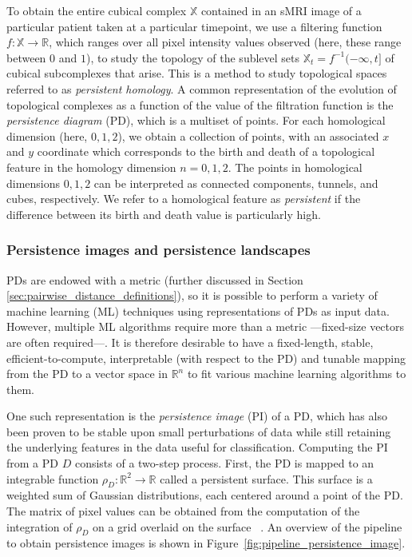 \documentclass{article}
\begin{document}
To obtain the entire cubical complex $\mathbb{X}$ contained in an sMRI image of a particular patient
taken at a particular timepoint, we use a filtering function $f:\mathbb{X}\to\mathbb{R}$, which
ranges over all pixel intensity values observed (here, these range between $0$ and $1$), to study
the topology of the sublevel sets $\mathbb{X}_t=f^{-1}(-\infty, t]$ of cubical subcomplexes that
arise. This is a method to study topological spaces referred to as \emph{persistent homology}. A
common representation of the evolution of topological complexes as a function of the value of the
filtration function is the \emph{persistence diagram} (PD), which is a multiset of points. For each
homological dimension (here, $0,1,2$), we obtain a collection of points, with an associated $x$ and
$y$ coordinate which corresponds to the birth and death of a topological feature in the homology
dimension $n=0,1,2$. The points in homological dimensions $0,1,2$ can be interpreted as
connected components, tunnels, and cubes, respectively. We refer to a homological feature as
\emph{persistent} if the difference between its birth and death value is particularly high.


\subsubsection{Persistence images and persistence
  landscapes}\label{sec:theory_persistence_landscape_persistence_image}

PDs are endowed with a metric (further discussed in Section
\ref{sec:pairwise_distance_definitions}), so it is possible to perform a variety of machine learning
(ML) techniques using representations of PDs as input data. However, multiple ML algorithms
require more than a metric ---fixed-size vectors are often required---. It is therefore
desirable to have a fixed-length, stable, efficient-to-compute, interpretable (with respect to the
PD) and tunable mapping from the PD to a vector space in $\mathbb{R}^n$ to fit various machine
learning algorithms to them.

One such representation is the \emph{persistence image} (PI) of a PD, which has also been proven to
be stable upon small perturbations of data while still retaining the underlying features in the data
useful for classification. Computing the PI from a PD $D$ consists of a two-step process. First, the
PD is mapped to an integrable function $\rho_D : \mathbb{R}^2\to \mathbb{R}$ called a persistent
surface. This surface is a weighted sum of Gaussian distributions, each centered around a point of
the PD. The matrix of pixel values can be obtained from the computation of the integration of
$\rho_D$ on a grid overlaid on the surface ~\citep{adams2017persistence}. An overview of the
pipeline to obtain persistence images is shown in Figure~\ref{fig:pipeline_persistence_image}.
\end{document}
